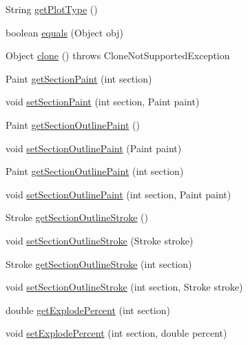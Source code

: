 \begin{DoxyCompactItemize}
String \mbox{\hyperlink{classorg_1_1jfree_1_1chart_1_1plot_1_1_pie_plot_a8fa087aa09e2d64393832e1295d9cdd9}{get\+Plot\+Type}} ()
\item 
boolean \mbox{\hyperlink{classorg_1_1jfree_1_1chart_1_1plot_1_1_pie_plot_a7e72854ed16ed67cff802c0fbd61f34d}{equals}} (Object obj)
\item 
Object \mbox{\hyperlink{classorg_1_1jfree_1_1chart_1_1plot_1_1_pie_plot_aa5257f387f4782dae8a2105bdfee40b9}{clone}} ()  throws Clone\+Not\+Supported\+Exception 
\item 
Paint \mbox{\hyperlink{classorg_1_1jfree_1_1chart_1_1plot_1_1_pie_plot_a3bdefeeb9e51b707b1bec9a4f71775e3}{get\+Section\+Paint}} (int section)
\item 
void \mbox{\hyperlink{classorg_1_1jfree_1_1chart_1_1plot_1_1_pie_plot_a2248c7e942d62ad0635e50227c3413ce}{set\+Section\+Paint}} (int section, Paint paint)
\item 
Paint \mbox{\hyperlink{classorg_1_1jfree_1_1chart_1_1plot_1_1_pie_plot_a237fbccf0cd23d51f4e62dfcd4a48e1d}{get\+Section\+Outline\+Paint}} ()
\item 
void \mbox{\hyperlink{classorg_1_1jfree_1_1chart_1_1plot_1_1_pie_plot_ae573b32fba1d3c66a0e25516f5e6da16}{set\+Section\+Outline\+Paint}} (Paint paint)
\item 
Paint \mbox{\hyperlink{classorg_1_1jfree_1_1chart_1_1plot_1_1_pie_plot_a07b4cfea40dfe0868d23c9e5264b7fc3}{get\+Section\+Outline\+Paint}} (int section)
\item 
void \mbox{\hyperlink{classorg_1_1jfree_1_1chart_1_1plot_1_1_pie_plot_acaf457a79b29ff758f90253213d410a6}{set\+Section\+Outline\+Paint}} (int section, Paint paint)
\item 
Stroke \mbox{\hyperlink{classorg_1_1jfree_1_1chart_1_1plot_1_1_pie_plot_a60e2103a7ab26844fe2b655fc713128b}{get\+Section\+Outline\+Stroke}} ()
\item 
void \mbox{\hyperlink{classorg_1_1jfree_1_1chart_1_1plot_1_1_pie_plot_adc66765328e7ab87744e3d0cfbc84611}{set\+Section\+Outline\+Stroke}} (Stroke stroke)
\item 
Stroke \mbox{\hyperlink{classorg_1_1jfree_1_1chart_1_1plot_1_1_pie_plot_a334be36253108e12b90a70e0ab4066be}{get\+Section\+Outline\+Stroke}} (int section)
\item 
void \mbox{\hyperlink{classorg_1_1jfree_1_1chart_1_1plot_1_1_pie_plot_a4533b2b8fa1d1b27c22b89af74204756}{set\+Section\+Outline\+Stroke}} (int section, Stroke stroke)
\item 
double \mbox{\hyperlink{classorg_1_1jfree_1_1chart_1_1plot_1_1_pie_plot_aa1ef98ca9158ebc50a475842e837be04}{get\+Explode\+Percent}} (int section)
\item 
void \mbox{\hyperlink{classorg_1_1jfree_1_1chart_1_1plot_1_1_pie_plot_af9aeb60b43813b876e3fbfed4ccd93f0}{set\+Explode\+Percent}} (int section, double percent)
\end{DoxyCompactItemize}
